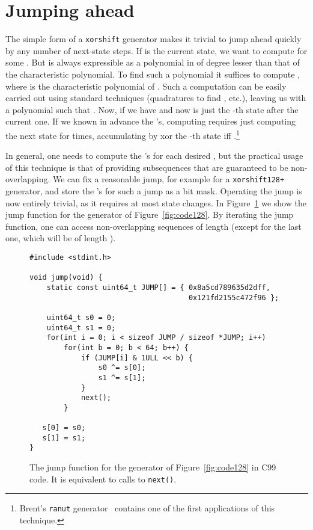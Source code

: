 \documentclass{acmsmalltr}
\newcommand{\xorshift}[1][]{\texttt{xorshift#1}\xspace}
\newcommand{\xorshiftp}[1][]{\texttt{xorshift#1+}\xspace}
\begin{document}
\section{Jumping ahead}

The simple form of a \xorshift generator makes it trivial to jump ahead quickly
by any number of next-state steps. If  is the current state, we want to
compute  for some . But  is always expressible as a
polynomial in  of degree lesser than that of the characteristic polynomial.
To find such a polynomial it suffices to compute , where 
is the characteristic polynomial of . Such a computation can be easily
carried out using standard techniques (quadratures to find ,
etc.), leaving us with a polynomial  such that . Now, if  we have  and now  is just the -th state
after the current one. If we known in advance the 's, computing  requires just computing the next state for  times, accumulating by xor
the -th state iff .\footnote{Brent's
\texttt{ranut} generator~\cite{BreURNGS} contains one of the first
applications of this technique.}

In general, one needs to compute the
's for each desired , but the practical usage of this technique is
that of providing subsequences that are guaranteed to be non-overlapping. We can
fix a reasonable jump, for example  for a \xorshiftp[128] generator, and
store the 's for such a jump as a bit mask. Operating the jump is now
entirely trivial, as it requires at most  state changes. In
Figure~\ref{fig:jump} we show the jump function for the
generator of Figure~\ref{fig:code128}. By iterating the jump function, one can
access  non-overlapping sequences of length  
(except for the last one, which will be of length ).

\begin{figure}[ht]
\centering
\begin{verbatim}
#include <stdint.h>

void jump(void) {
    static const uint64_t JUMP[] = { 0x8a5cd789635d2dff,
                                     0x121fd2155c472f96 };
	
    uint64_t s0 = 0;
    uint64_t s1 = 0;
    for(int i = 0; i < sizeof JUMP / sizeof *JUMP; i++)
        for(int b = 0; b < 64; b++) {
            if (JUMP[i] & 1ULL << b) {
                s0 ^= s[0];
                s1 ^= s[1];
            }
            next();
        }

   s[0] = s0;
   s[1] = s1;
}
\end{verbatim}
\caption{\label{fig:jump}The jump function for the generator of Figure~\ref{fig:code128}
in C99 code. It is equivalent to  calls to \texttt{next()}.}
\end{figure}
\end{document}
